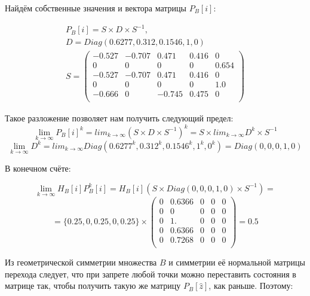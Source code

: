 Найдём собственные значения и вектора матрицы $P_B[i]$:

\begin{gather*}
 P_B[i] = S\times D \times S^{-1}, \\
 D = Diag(0.6277, 0.312, 0.1546, 1, 0) \\
 S = 
 \begin{pmatrix}
	-0.527 & -0.707 & 0.471 & 0.416 & 0 \\
	0 & 0 & 0 & 0 & 0.654 \\
	-0.527 & -0.707 & 0.471 & 0.416 & 0 \\
	0 & 0 & 0 & 0 & 1.0 \\
	-0.666 & 0 & -0.745 & 0.475 & 0 \\
 \end{pmatrix} 
\end{gather*}

Такое разложение позволяет нам получить следующий предел:
\begin{equation*}\lim_{k \to \infty} P_B[i]^k = lim_{k \to \infty} (S\times D \times S^{-1})^k = S \times lim_{k \to \infty} D^k \times S^{-1} \end{equation*}
\begin{equation*}\lim_{k \to \infty} D^k = lim_{k \to \infty} Diag (0.6277^k, 0.312^k, 0.1546^k, 1^k, 0^k) = Diag(0,0,0,1,0) \end{equation*}


В конечном счёте:

\begin{equation*}
	\lim_{k \to \infty} H_B[i] P_B^k[i] = H_B[i] (S \times Diag(0,0,0,1,0) \times S^{-1}) =
\end{equation*}
\begin{equation*}
= \{0.25, 0, 0.25, 0, 0.25\} \times 
	\begin{pmatrix}
	0 & 0.6366 & 0 & 0 & 0 \\
	0 & 0 & 0 & 0 & 0 \\
	0 & 1. & 0 & 0 & 0 \\
	0 & 0.6366 & 0 & 0 & 0 \\
	0 & 0.7268 & 0 &0 & 0 \\
	\end{pmatrix} 
	= 0.5
\end{equation*}

Из геометрической симметрии множества $B$ и симметрии её нормальной матрицы перехода следует, что при запрете любой точки можно переставить состояния
в матрице так, чтобы получить такую же матрицу $P_B[\hat z]$, как раньше. Поэтому:

